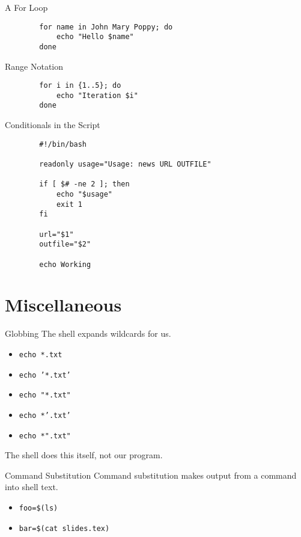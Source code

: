 \documentclass[pdf,usenames,dvipsnames,14pt]{beamer}%
\begin{document}
\begin{frame}[fragile]{A For Loop}
	\begin{verbatim}
		for name in John Mary Poppy; do
		    echo "Hello $name"
		done
	\end{verbatim}
\end{frame}

\begin{frame}[fragile]{Range Notation}
	\begin{verbatim}
		for i in {1..5}; do
		    echo "Iteration $i"
		done
	\end{verbatim}
\end{frame}

\begin{frame}[fragile]{Conditionals in the Script}
	\begin{verbatim}
		#!/bin/bash
		
		readonly usage="Usage: news URL OUTFILE"
		
		if [ $# -ne 2 ]; then
		    echo "$usage"
		    exit 1
		fi
		
		url="$1"
		outfile="$2"
		
		echo Working
	\end{verbatim}
\end{frame}

\section{Miscellaneous}

\begin{frame}{Globbing}
	The shell expands wildcards for us.
	\begin{itemize}
		\item \texttt{echo *.txt}
		\item \texttt{echo '*.txt'}
		\item \texttt{echo "*.txt"}
		\item \texttt{echo *'.txt'}
		\item \texttt{echo *".txt"}
	\end{itemize}
	The shell does this itself, not our program.
\end{frame}

\begin{frame}{Command Substitution}
	Command substitution makes output from a command into shell text.
	\begin{itemize}
		\item \texttt{foo=\$(ls)}
		\item \texttt{bar=\$(cat slides.tex)}
	\end{itemize}
\end{frame}
\end{document}

